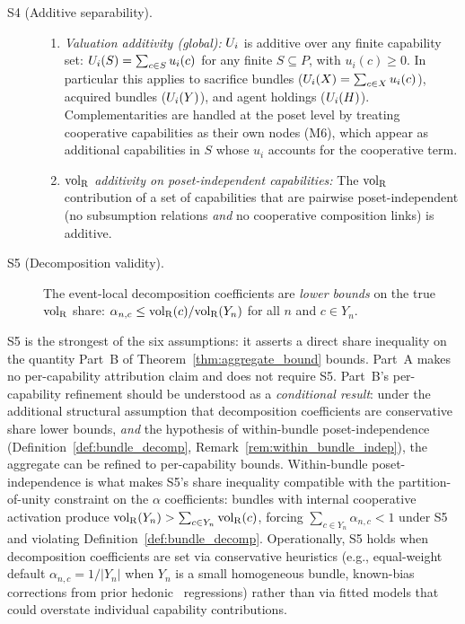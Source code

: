 \begin{description}
\item[S4 (Additive separability).] \mbox{}
  \begin{enumerate}
  \item[(a)] \emph{Valuation additivity (global):}
    $U_i$ is additive over any finite capability set:
    $U_i(S) = \sum_{c \in S} u_i(c)$ for any finite
    $S \subseteq P$, with $u_i(c) \geq 0$.  In particular this
    applies to sacrifice bundles ($U_i(X) = \sum_{c \in X}
    u_i(c)$), acquired bundles ($U_i(Y)$), and agent
    holdings ($U_i(H)$).  Complementarities are handled at the
    poset level by treating cooperative capabilities as their
    own nodes (M6), which appear as additional capabilities in
    $S$ whose $u_i$ accounts for the cooperative term.
  \item[(b)] \emph{${\operatorname{vol}_{\mathrm{R}}}$ additivity on poset-independent
    capabilities:} The ${\operatorname{vol}_{\mathrm{R}}}$ contribution of a set of
    capabilities that are pairwise poset-independent (no
    subsumption relations \emph{and} no cooperative composition
    links) is additive.
  \end{enumerate}

\item[S5 (Decomposition validity).] The event-local decomposition
  coefficients are \emph{lower bounds} on the true ${\operatorname{vol}_{\mathrm{R}}}$ share:
  $\alpha_{n,c} \leq {\operatorname{vol}_{\mathrm{R}}}(c) / {\operatorname{vol}_{\mathrm{R}}}(Y_n)$ for all $n$ and
  $c \in Y_n$.
\end{description}

\begin{remark}
\label{rem:s5_heavy}
S5 is the strongest of the six assumptions: it asserts a direct
share inequality on the quantity Part~B of
Theorem~\ref{thm:aggregate_bound} bounds.  Part~A makes no
per-capability attribution claim and does not require S5.
Part~B's per-capability refinement should be understood as a
\emph{conditional result}: under the additional structural
assumption that decomposition coefficients are conservative
share lower bounds, \emph{and} the hypothesis of within-bundle
poset-independence (Definition~\ref{def:bundle_decomp},
Remark~\ref{rem:within_bundle_indep}), the aggregate can be
refined to per-capability bounds.  Within-bundle
poset-independence is what makes S5's share inequality
compatible with the partition-of-unity constraint on the
$\alpha$ coefficients: bundles with internal cooperative
activation produce ${\operatorname{vol}_{\mathrm{R}}}(Y_n) > \sum_{c \in Y_n} {\operatorname{vol}_{\mathrm{R}}}(c)$,
forcing $\sum_{c \in Y_n} \alpha_{n,c} < 1$ under S5 and
violating Definition~\ref{def:bundle_decomp}.  Operationally, S5 holds when
decomposition coefficients are set via conservative heuristics
(e.g., equal-weight default $\alpha_{n,c} = 1/|Y_n|$ when $Y_n$
is a small homogeneous bundle, known-bias corrections from prior
hedonic~\citep{rosen1974hedonic} regressions) rather than via
fitted models that could overstate individual capability
contributions.
\end{remark}

